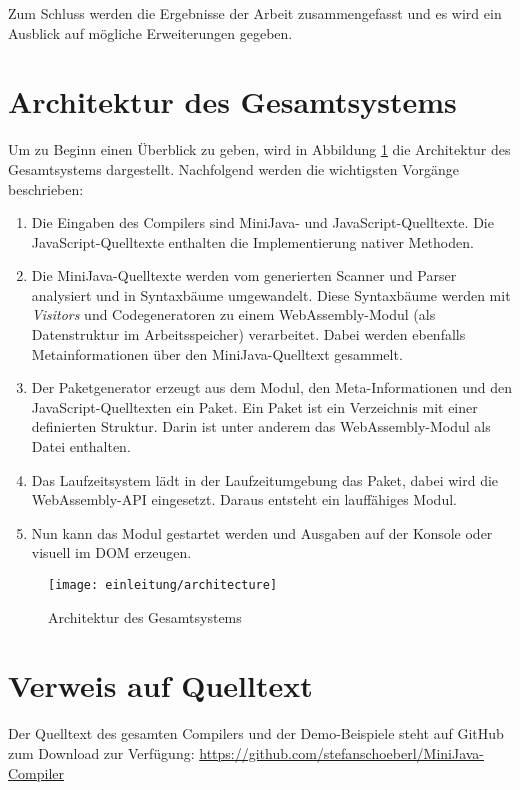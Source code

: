 Zum Schluss werden die Ergebnisse der Arbeit zusammengefasst und es wird ein Ausblick auf mögliche Erweiterungen gegeben.

\pagebreak
\section{Architektur des Gesamtsystems}

Um zu Beginn einen Überblick zu geben, wird in Abbildung \ref{fig:architecture} die Architektur des Gesamtsystems dargestellt. Nachfolgend werden die wichtigsten Vorgänge beschrieben:

\begin{enumerate}
    \item Die Eingaben des Compilers sind MiniJava- und Ja\-va\-Script-Quelltexte. Die Ja\-va\-Script-Quelltexte enthalten die Implementierung nativer Methoden.
    \item Die MiniJava-Quelltexte werden vom generierten Scanner und Parser analysiert und in Syntaxbäume umgewandelt. Diese Syntaxbäume werden mit \emph{Visitors} und Codegeneratoren zu einem WebAssembly-Modul (als Datenstruktur im Arbeitsspeicher) verarbeitet. Dabei werden ebenfalls Metainformationen über den Mi\-ni\-Ja\-va-Quelltext gesammelt.
    \item Der Paketgenerator erzeugt aus dem Modul, den Meta-Informationen und den JavaScript-Quelltexten ein Paket. Ein Paket ist ein Verzeichnis mit einer definierten Struktur. Darin ist unter anderem das WebAssembly-Modul als Datei enthalten.
    \item Das Laufzeitsystem lädt in der Laufzeitumgebung das Paket, dabei wird die Web\-As\-sem\-bly-API eingesetzt. Daraus entsteht ein lauffähiges Modul.
    \item Nun kann das Modul gestartet werden und Ausgaben auf der Konsole oder visuell im DOM erzeugen.
\end{enumerate}


\begin{figure}[]
    \centering
    \texttt{[image: einleitung/architecture]}
    \caption{Architektur des Gesamtsystems}
    \label{fig:architecture}
\end{figure}

\section{Verweis auf Quelltext}
Der Quelltext des gesamten Compilers und der Demo-Beispiele steht auf GitHub zum Download zur Verfügung: \url{https://github.com/stefanschoeberl/MiniJava-Compiler}
